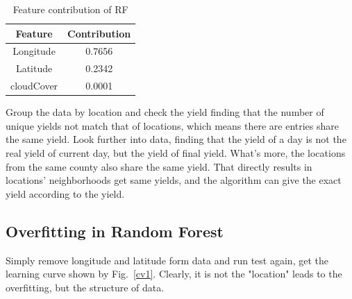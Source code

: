 \documentclass[conference]{IEEEtran}
\begin{document}
\begin{table}[htbp]
    \caption{Feature contribution of RF}
    \begin{center}
    \begin{tabular}{|c|c|}
    \hline
      Feature & Contribution \\
    \hline
      Longitude & 0.7656 \\
      Latitude & 0.2342 \\
      cloudCover & 0.0001 \\
    \hline
    \end{tabular}
    \label{tab:RF_contribution}
    \end{center}
\end{table}

Group the data by location and check the yield finding that the number of unique yields not match that of locations, which means there are entries share the same yield. Look further into data, finding that the yield of a day is not the real yield of current day, but the yield of final yield. What's more, the locations from the same county also share the same yield. That directly results in locations' neighborhoods get same yields, and the algorithm can give the exact yield according to the yield. 

\subsection{Overfitting in Random Forest}
Simply remove longitude and latitude form data and run test again, get the learning curve shown by Fig.~\ref{cv1}. Clearly, it is not the "location" leads to the overfitting, but the structure of data.
\end{document}
